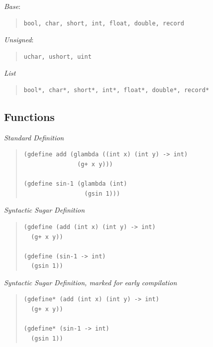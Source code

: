 \documentclass{article}
\begin{document}
\raggedright{}{
  {\emph{Base}}:
}

\begin{quote}
\begin{verbatim}
bool, char, short, int, float, double, record
\end{verbatim}
\end{quote}

\raggedright{}{
  {\emph{Unsigned}}:
}

\begin{quote}
\begin{verbatim}
uchar, ushort, uint
\end{verbatim}
\end{quote}

\raggedright{}{
{\emph{List}}
}
\begin{quote}
\begin{verbatim}
bool*, char*, short*, int*, float*, double*, record*
\end{verbatim}
\end{quote}

\subsection{Functions}

\raggedright{}{
{\emph{Standard Definition}}
}
\begin{quote}
\begin{verbatim}
(gdefine add (glambda ((int x) (int y) -> int)
               (g+ x y)))

(gdefine sin-1 (glambda (int)
                 (gsin 1)))
\end{verbatim}
\end{quote}

\raggedright{}{
{\emph{Syntactic Sugar Definition}}
}
\begin{quote}
\begin{verbatim}
(gdefine (add (int x) (int y) -> int)
  (g+ x y))

(gdefine (sin-1 -> int)
  (gsin 1))

\end{verbatim}
\end{quote}

\raggedright{}{
{\emph{Syntactic Sugar Definition, marked for early compilation}}
}
\begin{quote}
\begin{verbatim}
(gdefine* (add (int x) (int y) -> int)
  (g+ x y))

(gdefine* (sin-1 -> int)
  (gsin 1))

\end{verbatim}
\end{quote}
\end{document}
